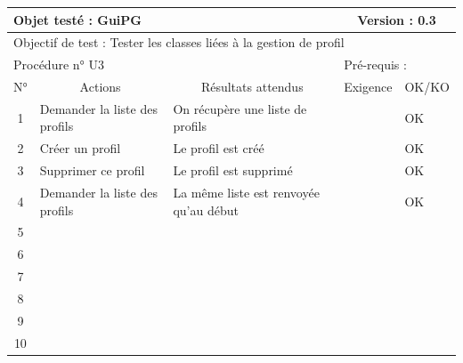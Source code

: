 \documentclass{../res/univ-projet}
\begin{document}
\begin{center}
    \begin{tabular}{|c|p{5cm}|p{5cm}|p{1.5cm}|p{1.5cm}|}
      \hline
      \multicolumn{3}{|l|}{Objet testé : GuiPG} & \multicolumn{2}{c|}{Version : 0.3}\\ \hline
      \multicolumn{5}{|l|}{Objectif de test : Tester les classes liées à la gestion de profil}\\ \hline
      \multicolumn{3}{|l|}{Procédure n° U3} & \multicolumn{2}{p{3cm}|}{Pré-requis : }\\ \hline
      \multicolumn{1}{|c|}{N°} & \multicolumn{1}{c|}{Actions} & \multicolumn{1}{c|}{Résultats attendus} & 
      \multicolumn{1}{c|}{Exigence} & \multicolumn{1}{c|}{OK/KO}\\ \hline
      1 & Demander la liste des profils & On récupère une liste de profils &  & OK \\
      2 & Créer un profil & Le profil est créé &  & OK \\
      3 & Supprimer ce profil & Le profil est supprimé &  & OK \\ 
      4 & Demander la liste des profils & La même liste est renvoyée qu'au début &  & OK \\
      5 &  &  &  & \\
      6 &  &  &  & \\
      7 &  &  &  & \\
      8 &  &  &  & \\
      9 &  &  &  & \\
      10 &  &  &  &\\ 
  \hline
    \end{tabular}
    \vskip 2.2cm




\end{center}
\end{document}
